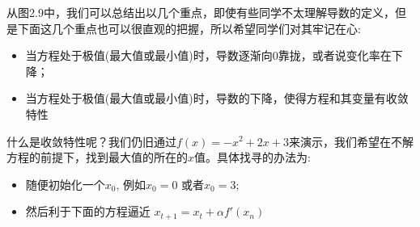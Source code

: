 \documentclass[12pt]{article}
\numberwithin{figure}{section}
\numberwithin{equation}{section}
\begin{document}
从图2.9中，我们可以总结出以几个重点，即使有些同学不太理解导数的定义，但是下面这几个重点也可以很直观的把握，所以希望同学们对其牢记在心:
		\begin{itemize}
			\item 当方程处于极值(最大值或最小值)时，导数逐渐向$0$靠拢，或者说变化率在下降；
			\item 当方程处于极值(最大值或最小值)时，导数的下降，使得方程和其变量有收敛特性
		\end{itemize}
		什么是收敛特性呢？我们仍旧通过$f(x)=-x^2+2x+3$来演示，我们希望在不解方程的前提下，找到最大值的所在的$x$值。具体找寻的办法为:
		\begin{itemize}
			\item 随便初始化一个$x_0$, 例如$x_0 = 0$ 或者$x_0=3$;
			\item 然后利于下面的方程逼近 $x_{t+1} = x_t + \alpha f'(x_n)$
		\end{itemize}
		
\end{document}
